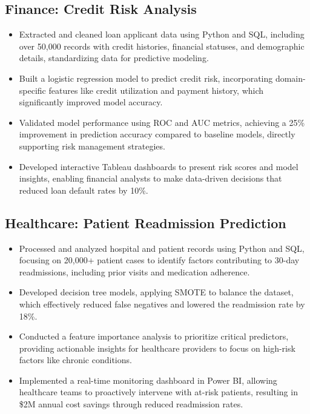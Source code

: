 \documentclass[12pt,a4paper]{article}
\begin{document}
\subsection*{Finance: Credit Risk Analysis}
\begin{itemize}[leftmargin=*,noitemsep,topsep=0pt]
\item Extracted and cleaned loan applicant data using Python and SQL, including over 50,000 records with credit histories, financial statuses, and demographic details, standardizing data for predictive modeling.
\item Built a logistic regression model to predict credit risk, incorporating domain-specific features like credit utilization and payment history, which significantly improved model accuracy.
\item Validated model performance using ROC and AUC metrics, achieving a 25\% improvement in prediction accuracy compared to baseline models, directly supporting risk management strategies.
\item Developed interactive Tableau dashboards to present risk scores and model insights, enabling financial analysts to make data-driven decisions that reduced loan default rates by 10\%.
\end{itemize}

\subsection*{Healthcare: Patient Readmission Prediction}
\begin{itemize}[leftmargin=*,noitemsep,topsep=0pt]
\item Processed and analyzed hospital and patient records using Python and SQL, focusing on 20,000+ patient cases to identify factors contributing to 30-day readmissions, including prior visits and medication adherence.
\item Developed decision tree models, applying SMOTE to balance the dataset, which effectively reduced false negatives and lowered the readmission rate by 18\%.
\item Conducted a feature importance analysis to prioritize critical predictors, providing actionable insights for healthcare providers to focus on high-risk factors like chronic conditions.
\item Implemented a real-time monitoring dashboard in Power BI, allowing healthcare teams to proactively intervene with at-risk patients, resulting in \$2M annual cost savings through reduced readmission rates.
\end{itemize}
\end{document}
